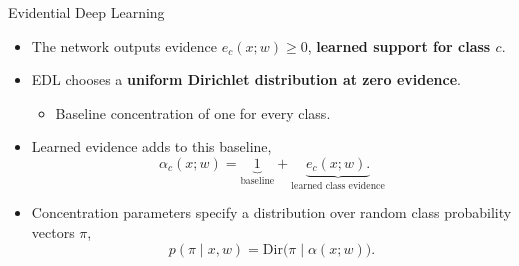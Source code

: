     \begin{frame}{Evidential Deep Learning }
    \label{frm:backup-edl-evidence-meaning}
    \begin{itemize}
    \setlength{\itemsep}{5mm}
    \item The network outputs evidence $e_c(x;w)\geq0$, \textbf{learned support for class $c$}.
    \item EDL chooses a \textbf{uniform Dirichlet distribution at zero evidence}.
    \begin{itemize}
    \item Baseline concentration of one for every class.
    \end{itemize}
    \item Learned evidence adds to this baseline,
    \[
    \alpha_c(x;w)=\underbrace{1}_{\text{baseline}}
    +\underbrace{e_c(x;w).}_{\text{learned class evidence}}
    \]
    \item Concentration parameters specify a distribution over random class probability vectors $\pi$,
    \[
    p(\pi\mid x,w)=\mathrm{Dir}\bigl(\pi\mid\alpha(x;w)\bigr).
    \]
    \end{itemize}
    \end{frame}
    

